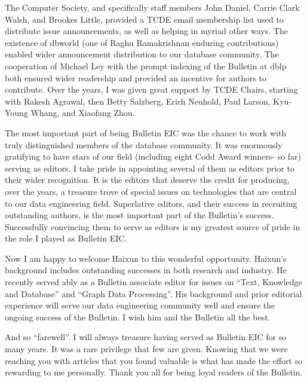 \documentclass[11pt]{article}
\begin{document}
The Computer Society, and specifically staff members John Daniel, Carrie Clark Walsh, and Brookes Little, provided a TCDE email membership list used to distribute issue announcements, as well as helping in myriad other ways. The existence of dbworld (one of Raghu Ramakrishnan enduring contributions) enabled wider announcement distribution to our database community. The cooperation of Michael Ley with the prompt indexing of the Bulletin at dblp both ensured wider readership and provided an incentive for authors to contribute. Over the years, I was given great support by TCDE Chairs, starting with Rakesh Agrawal, then Betty Salzberg, Erich Neuhold, Paul Larson, Kyu-Young Whang, and Xiaofang Zhou. 

The most important part of being Bulletin EIC was the chance to work with truly distinguished members of the database community. It was enormously gratifying to have stars of our field (including eight Codd Award winners- so far) serving as editors. I take pride in appointing several of them as editors prior to their wider recognition.  It is the editors that deserve the credit for producing, over the years, a treasure trove of special issues on technologies that are central to our data engineering field. Superlative editors, and their success in recruiting outstanding authors, is the most important part of the Bulletin's success. Successfully convincing them to serve as editors is my greatest source of pride in the role I played as Bulletin EIC.  

Now I am happy to welcome Haixun to this wonderful opportunity.  Haixun's background includes outstanding successes in both research and industry.  He recently served ably as a Bulletin associate editor for issues on ``Text, Knowledge and Database'' and ``Graph Data Processing''.  His background and prior editorial experience will serve our data engineering community well and ensure the ongoing success of the Bulletin.  I wish him and the Bulletin all the best.

And so ``farewell''.  I will always treasure having served as Bulletin EIC for so many years. It was a rare privilege that few are given. Knowing that we were reaching you with articles that you found valuable is what has made the effort so rewarding to me personally. Thank you all for being loyal readers of the Bulletin. 
\end{document}
